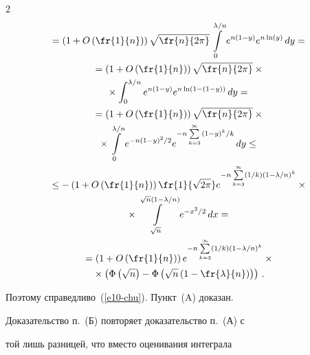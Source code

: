 \begin{multicols}{2}
\begin{multline*}
{}=\left(1+O\left(\fr{1}{n}\right)\right)


\sqrt{\fr{n}{2\pi}}


\int\limits_0^{{\lambda}/{n}}e^{n(1-y)}e^{n\ln(y)}\,dy={}\\


{}=


\left(1+O\left(\fr{1}{n}\right)\right) \sqrt{\fr{n}{2\pi}}\times{}\\


{}\times


\int_0^{{\lambda}/{n}}e^{n(1-y)}e^{n\ln(1-(1-y))}\,dy={}\\


{}=


\left(1+O\left(\fr{1}{n}\right)\right) \sqrt{\fr{n}{2\pi}}\times{}\\


{}\times


\int\limits_0^{{\lambda}/{n}}e^{-n{(1-y)^2}/2}


e^{-n\sum\limits_{k=3}^{\infty}{(1-y)^k}/{k}}\,dy


\le {}\\


{}\le-\left(1+O\left(\fr{1}{n}\right)\right)


\fr{1}{\sqrt{2\pi}}e^{-n\sum\limits_{k=3}^{\infty}(1/k)\left(1-{\lambda}/{n}\right)^k}\times{}\\


{}\times


\int\limits_{\sqrt{n}}^{\sqrt{n}\left(1-{\lambda}/{n}\right)}e^{-{x^2}/{2}}\,dx={}\\


{}=


\left(1+O\left(\fr{1}{n}\right)\right)e^{-n\sum\limits_{k=3}^{\infty}({1}/{k})\left(1-{\lambda}/{n}


\right)^k}\times{}\\


{}\times


\left(\Phi\left(\sqrt{n}\right)-\Phi\left(\sqrt{n}\left(1-\fr{\lambda}{n}\right)\right)\right)\,.


\end{multline*}


Поэтому справедливо~(\ref{e10-chu}). Пункт~(A) доказан.





Доказательство п.~(Б) повторяет доказательство п.~(А) с


той лишь разницей, что вместо оценивания интеграла



\end{multicols}
